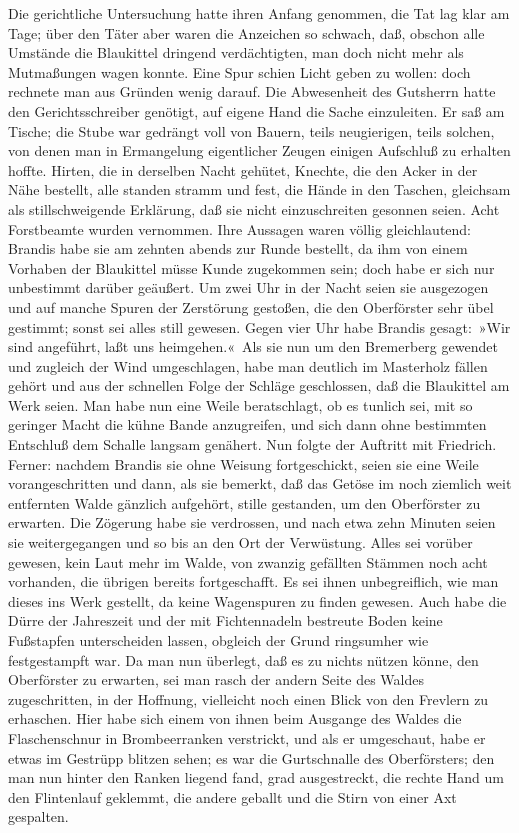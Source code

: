 Die gerichtliche Untersuchung hatte ihren Anfang genommen, die Tat lag klar am Tage; über den Täter aber waren die Anzeichen so schwach, daß, obschon alle Umstände die Blaukittel dringend verdächtigten, man doch nicht mehr als Mutmaßungen wagen konnte. Eine Spur schien Licht geben zu wollen: doch rechnete man aus Gründen wenig darauf. Die Abwesenheit des Gutsherrn hatte den Gerichtsschreiber genötigt, auf eigene Hand die Sache einzuleiten. Er saß am Tische; die Stube war gedrängt voll von Bauern, teils neugierigen, teils solchen, von denen man in Ermangelung eigentlicher Zeugen einigen Aufschluß zu erhalten hoffte. Hirten, die in derselben Nacht gehütet, Knechte, die den Acker in der Nähe bestellt, alle standen stramm und fest, die Hände in den Taschen, gleichsam als stillschweigende Erklärung, daß sie nicht einzuschreiten gesonnen seien. Acht Forstbeamte wurden vernommen. Ihre Aussagen waren völlig gleichlautend: Brandis habe sie am zehnten abends zur Runde bestellt, da ihm von einem Vorhaben der Blaukittel müsse Kunde zugekommen sein; doch habe er sich nur unbestimmt darüber geäußert. Um zwei Uhr in der Nacht seien sie ausgezogen und auf manche Spuren der Zerstörung gestoßen, die den Oberförster sehr übel gestimmt; sonst sei alles still gewesen. Gegen vier Uhr habe Brandis gesagt: »Wir sind angeführt, laßt uns heimgehen.« Als sie nun um den Bremerberg gewendet und zugleich der Wind umgeschlagen, habe man deutlich im Masterholz fällen gehört und aus der schnellen Folge der Schläge geschlossen, daß die Blaukittel am Werk seien. Man habe nun eine Weile beratschlagt, ob es tunlich sei, mit so geringer Macht die kühne Bande anzugreifen, und sich dann ohne bestimmten Entschluß dem Schalle langsam genähert. Nun folgte der Auftritt mit Friedrich. Ferner: nachdem Brandis sie ohne Weisung fortgeschickt, seien sie eine Weile vorangeschritten und dann, als sie bemerkt, daß das Getöse im noch ziemlich weit entfernten Walde gänzlich aufgehört, stille gestanden, um den Oberförster zu erwarten. Die Zögerung habe sie verdrossen, und nach etwa zehn Minuten seien sie weitergegangen und so bis an den Ort der Verwüstung. Alles sei vorüber gewesen, kein Laut mehr im Walde, von zwanzig gefällten Stämmen noch acht vorhanden, die übrigen bereits fortgeschafft. Es sei ihnen unbegreiflich, wie man dieses ins Werk gestellt, da keine Wagenspuren zu finden gewesen. Auch habe die Dürre der Jahreszeit und der mit Fichtennadeln bestreute Boden keine Fußstapfen unterscheiden lassen, obgleich der Grund ringsumher wie festgestampft war. Da man nun überlegt, daß es zu nichts nützen könne, den Oberförster zu erwarten, sei man rasch der andern Seite des Waldes zugeschritten, in der Hoffnung, vielleicht noch einen Blick von den Frevlern zu erhaschen. Hier habe sich einem von ihnen beim Ausgange des Waldes die Flaschenschnur in Brombeerranken verstrickt, und als er umgeschaut, habe er etwas im Gestrüpp blitzen sehen; es war die Gurtschnalle des Oberförsters; den man nun hinter den Ranken liegend fand, grad ausgestreckt, die rechte Hand um den Flintenlauf geklemmt, die andere geballt und die Stirn von einer Axt gespalten.

